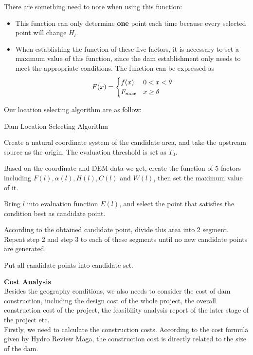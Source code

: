 \documentclass{mcmthesis}
\begin{document}
There are something need to note when using this function:
\begin{itemize}
  \item This function can only determine \textbf{one} point each time because every selected point will change $H_l$.
  \item When establishing the function of these five factors, it is necessary to set a maximum value of this function, since the dam establishment only needs to meet the appropriate conditions. The function can be expressed as 
  \begin{eqnarray}
  F(x) =
  \begin{cases}
  f(x) & 0 < x < \theta \cr F_{max} & x \ge \theta
  \end{cases}
  \end{eqnarray}
\end{itemize}
Our location selecting algorithm are as follow:
\begin{framed}
\begin{list}{.}
    {\setlength{\parsep}{0ex}\setlength{\itemsep}{0ex}}
\item[] Dam Location Selecting Algorithm
\item Create a natural coordinate system of the candidate area, and take the upstream source as the origin. The evaluation threshold is set as $T_{0}$.
\item Based on the coordinate and DEM data we get, create the function of 5 factors including $F(l),\alpha(l),H(l),C(l)$ and $W(l)$, then set the maximum value of it.
\item Bring $l$ into evaluation function $E(l)$, and select the point that satisfies the condition best as candidate point.
\item According to the obtained candidate point, divide this area into 2 segment. Repeat step 2 and step 3 to each of these segments until no new candidate points are generated.
\item Put all candidate points into candidate set.
\end{list}
\end{framed}
\textbf{Cost Analysis}\\
\indent Besides the geography conditions, we also needs to consider the cost of dam construction, including the design cost of the whole project, the overall construction cost of the project, the feasibility analysis report of the later stage of the project etc.\\
Firstly, we need to calculate the construction costs. According to the cost formula given by Hydro Review Maga, the construction cost is directly related to the size of the dam.
\end{document}
